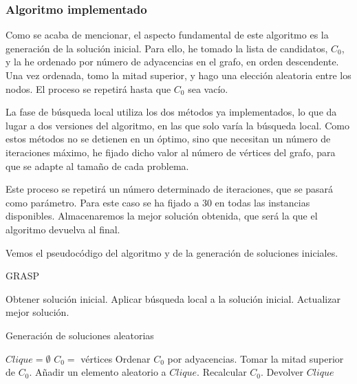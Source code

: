 \subsubsection{Algoritmo implementado}

Como se acaba de mencionar, el aspecto fundamental de este algoritmo es la generación de la solución inicial.
Para ello, he tomado la lista de candidatos, $C_0$, y la he ordenado por número de adyacencias en el grafo,
en orden descendente. Una vez ordenada, tomo la mitad superior, y hago una elección aleatoria entre los nodos.
El proceso se repetirá hasta que $C_0$ sea vacío.

La fase de búsqueda local utiliza los dos métodos ya implementados, lo que da lugar a dos versiones del algoritmo,
en las que solo varía la búsqueda local. Como estos métodos no se detienen en un óptimo, sino que necesitan
un número de iteraciones máximo, he fijado dicho valor al número de vértices del grafo, para que se adapte
al tamaño de cada problema.

Este proceso se repetirá un número determinado de iteraciones, que se pasará como parámetro. Para este caso
se ha fijado a 30 en todas las instancias disponibles. Almacenaremos la mejor solución obtenida, que será
la que el algoritmo devuelva al final.

Vemos el pseudocódigo del algoritmo y de la generación de soluciones iniciales.

\begin{algorithm}[H]
\caption{GRASP}
  \begin{algorithmic}
  \Repeat
    \State Obtener solución inicial.
    \State Aplicar búsqueda local a la solución inicial.
    \State Actualizar mejor solución.
  \end{algorithmic}
\end{algorithm}

\begin{algorithm}[H]
\caption{Generación de soluciones aleatorias}
  \begin{algorithmic}
    \State $Clique = \emptyset$
    \State $C_0 =$ vértices
    \Repeat
      \State Ordenar $C_0$ por adyacencias.
      \State Tomar la mitad superior de $C_0$.
      \State Añadir un elemento aleatorio a $Clique$.
      \State Recalcular $C_0$.
    \State Devolver $Clique$
  \end{algorithmic}
\end{algorithm}


